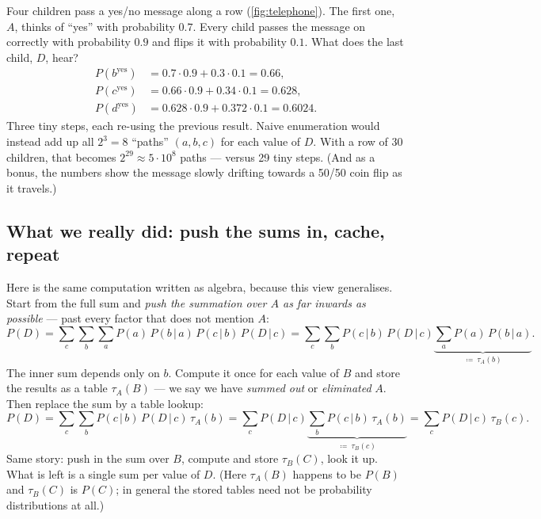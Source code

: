\documentclass[11pt, oneside]{book}
\newcommand{\Prob}{\mathbb{P}}           %
\newcommand{\given}{\,\vert\,}           %
\newcommand{\eqdef}{\coloneqq}           %
\let\originalsubsection\subsection
\renewcommand{\subsection}{\Needspace{6\baselineskip}\originalsubsection}
\begin{document}
\begin{exbox}[title={The telephone game (``Stille Post'')}]
Four children pass a yes/no message along a row (\cref{fig:telephone}). The
first one, $A$, thinks of ``yes'' with probability $0.7$. Every child passes
the message on correctly with probability $0.9$ and flips it with
probability $0.1$. What does the last child, $D$, hear?
\begin{align*}
P(b^{\text{yes}}) &= 0.7 \cdot 0.9 + 0.3 \cdot 0.1 = 0.66, \\
P(c^{\text{yes}}) &= 0.66 \cdot 0.9 + 0.34 \cdot 0.1 = 0.628, \\
P(d^{\text{yes}}) &= 0.628 \cdot 0.9 + 0.372 \cdot 0.1 = 0.6024 .
\end{align*}
Three tiny steps, each re-using the previous result. Naive enumeration would
instead add up all $2^3 = 8$ ``paths'' $(a, b, c)$ for each value of $D$.
With a row of 30 children, that becomes $2^{29} \approx 5 \cdot 10^8$ paths
--- versus 29 tiny steps. (And as a bonus, the numbers show the message
slowly drifting towards a 50/50 coin flip as it travels.)
\end{exbox}

\subsection{What we really did: push the sums in, cache, repeat}

Here is the same computation written as algebra, because this view
generalises. Start from the full sum and \emph{push the summation over $A$ as
far inwards as possible} --- past every factor that does not mention $A$:
\[
P(D) = \sum_{c}\sum_{b}\sum_{a} P(a)\, P(b \given a)\, P(c \given b)\, P(D \given c)
     = \sum_{c}\sum_{b} P(c \given b)\, P(D \given c) \underbrace{\sum_{a} P(a)\, P(b \given a)}_{\eqdef\ \tau_A(b)} .
\]
The inner sum depends only on $b$. Compute it once for each value of $B$ and
store the results as a table $\tau_A(B)$ --- we say we have \emph{summed out}
or \emph{eliminated} $A$. Then replace the sum by a table lookup:
\[
P(D) = \sum_{c}\sum_{b} P(c \given b)\, P(D \given c)\, \tau_A(b)
     = \sum_{c} P(D \given c) \underbrace{\sum_{b} P(c \given b)\, \tau_A(b)}_{\eqdef\ \tau_B(c)}
     = \sum_{c} P(D \given c)\, \tau_B(c).
\]
Same story: push in the sum over $B$, compute and store $\tau_B(C)$, look it
up. What is left is a single sum per value of $D$. (Here $\tau_A(B)$ happens
to be $P(B)$ and $\tau_B(C)$ is $P(C)$; in general the stored tables need not
be probability distributions at all.)
\end{document}
